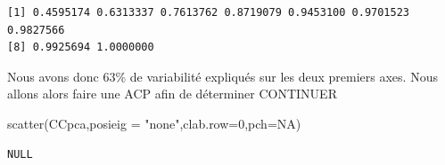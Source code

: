 \documentclass[
]{article}
\newenvironment{Shaded}{}{}
\newcommand{\AttributeTok}[1]{#1}
\newcommand{\CommentTok}[1]{\textcolor[rgb]{0.00,0.50,0.00}{#1}}
\newcommand{\ConstantTok}[1]{#1}
\newcommand{\DecValTok}[1]{#1}
\newcommand{\FunctionTok}[1]{#1}
\newcommand{\NormalTok}[1]{#1}
\newcommand{\OtherTok}[1]{\textcolor[rgb]{1.00,0.25,0.00}{#1}}
\newcommand{\SpecialCharTok}[1]{\textcolor[rgb]{0.00,0.50,0.50}{#1}}
\newcommand{\StringTok}[1]{\textcolor[rgb]{0.00,0.50,0.50}{#1}}
\begin{document}
\begin{Shaded}
\end{Shaded}

\begin{verbatim}
[1] 0.4595174 0.6313337 0.7613762 0.8719079 0.9453100 0.9701523 0.9827566
[8] 0.9925694 1.0000000
\end{verbatim}

Nous avons donc 63\% de variabilité expliqués sur les deux premiers
axes. Nous allons alors faire une ACP afin de déterminer CONTINUER

\begin{Shaded}
\begin{Highlighting}[]
\FunctionTok{scatter}\NormalTok{(CCpca,}\AttributeTok{posieig =} \StringTok{"none"}\NormalTok{,}\AttributeTok{clab.row=}\DecValTok{0}\NormalTok{,}\AttributeTok{pch=}\ConstantTok{NA}\NormalTok{)}
\end{Highlighting}
\end{Shaded}

\begin{verbatim}
NULL
\end{verbatim}

\begin{Shaded}
\end{Shaded}
\end{document}
